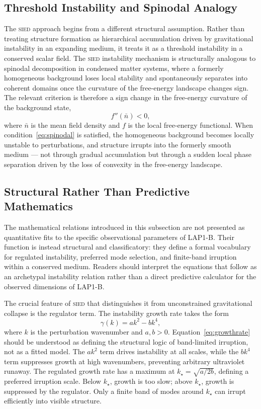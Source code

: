 \documentclass[12pt, a4paper]{article}
\newcommand{\nbar}{\bar{n}}
\newcommand{\SIED}{\textsc{sied}}
\theoremstyle{definition}
\begin{document}
\subsection{Threshold Instability and Spinodal Analogy}

The \SIED{} approach begins from a different structural assumption. Rather than
treating structure formation as hierarchical accumulation driven by gravitational
instability in an expanding medium, it treats it as a threshold instability in
a conserved scalar field. The \SIED{} instability mechanism is structurally
analogous to spinodal decomposition in condensed matter systems, where a
formerly homogeneous background loses local stability and spontaneously
separates into coherent domains once the curvature of the free-energy landscape
changes sign. The relevant criterion is therefore a sign change in the
free-energy curvature of the background state,
\begin{equation}
  f''(\nbar) < 0,
  \label{eq:spinodal}
\end{equation}
where $\nbar$ is the mean field density and $f$ is the local free-energy
functional. When condition~\eqref{eq:spinodal} is satisfied, the homogeneous
background becomes locally unstable to perturbations, and structure irrupts
into the formerly smooth medium --- not through gradual accumulation but
through a sudden local phase separation driven by the loss of convexity in
the free-energy landscape.

\subsection{Structural Rather Than Predictive Mathematics}

The mathematical relations introduced in this subsection are not presented
as quantitative fits to the specific observational parameters of LAP1-B.
Their function is instead structural and classificatory: they define a formal
vocabulary for regulated instability, preferred mode selection, and
finite-band irruption within a conserved medium. Readers should interpret
the equations that follow as an archetypal instability relation rather than
a direct predictive calculator for the observed dimensions of LAP1-B.

The crucial feature of \SIED{} that distinguishes it from unconstrained
gravitational collapse is the regulator term. The instability growth rate
takes the form
\begin{equation}
  \gamma(k) = a k^{2} - b k^{4},
  \label{eq:growthrate}
\end{equation}
where $k$ is the perturbation wavenumber and $a, b > 0$. Equation~\eqref{eq:growthrate}
should be understood as defining the structural logic of band-limited irruption,
not as a fitted model. The $ak^{2}$ term drives instability at all scales,
while the $bk^{4}$ term suppresses growth at high wavenumbers, preventing
arbitrary ultraviolet runaway. The regulated growth rate has a maximum at
$k_{\star} = \sqrt{a/2b}$, defining a preferred irruption scale. Below
$k_{\star}$, growth is too slow; above $k_{\star}$, growth is suppressed by
the regulator. Only a finite band of modes around $k_{\star}$ can irrupt
efficiently into visible structure.
\end{document}
